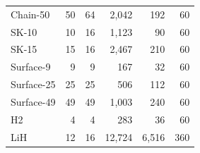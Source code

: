 \begin{table}[t]
\begin{tabular}{lrrrrr}
    Chain-50   & 50 & 64 &  2,042 & 192 &  60 \\
    SK-10      & 10 & 16 &  1,123 &  90 &  60 \\
    SK-15      & 15 & 16 &  2,467 & 210 &  60 \\
    Surface-9  &  9 &  9 &    167 &  32 &  60 \\
    Surface-25 & 25 & 25 &    506 & 112 &  60 \\
    Surface-49 & 49 & 49 &  1,003 & 240 &  60 \\
    H2         &  4 &  4 &    283 &  36 &  60 \\
    LiH        & 12 & 16 & 12,724 & 6,516 & 360 \\
    \bottomrule
  \end{tabular}
\end{table}
